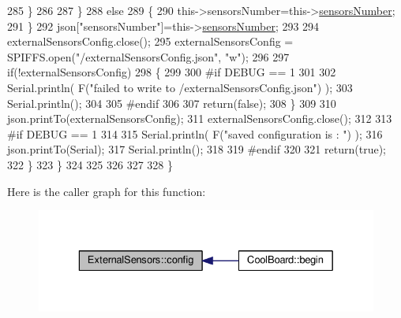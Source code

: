 \begin{DoxyCode}
285                 \}
286  
287             \}
288             \textcolor{keywordflow}{else}
289             \{
290                 this->sensorsNumber=this->\hyperlink{class_external_sensors_a58e4fbf9adeae787d92be5fa33043b5d}{sensorsNumber};
291             \}
292             json[\textcolor{stringliteral}{"sensorsNumber"}]=this->\hyperlink{class_external_sensors_a58e4fbf9adeae787d92be5fa33043b5d}{sensorsNumber};
293 
294             externalSensorsConfig.close();
295             externalSensorsConfig = SPIFFS.open(\textcolor{stringliteral}{"/externalSensorsConfig.json"}, \textcolor{stringliteral}{"w"});
296 
297             \textcolor{keywordflow}{if}(!externalSensorsConfig)
298             \{
299             
300 \textcolor{preprocessor}{            #if DEBUG == 1 }
301 
302                 Serial.println( F(\textcolor{stringliteral}{"failed to write to /externalSensorsConfig.json"}) );
303                 Serial.println();
304             
305 \textcolor{preprocessor}{            #endif}
306 
307                 \textcolor{keywordflow}{return}(\textcolor{keyword}{false});
308             \}
309             
310             json.printTo(externalSensorsConfig);
311             externalSensorsConfig.close();
312             
313 \textcolor{preprocessor}{        #if DEBUG == 1 }
314 
315             Serial.println( F(\textcolor{stringliteral}{"saved configuration is : "}) );
316             json.printTo(Serial);
317             Serial.println();
318         
319 \textcolor{preprocessor}{        #endif}
320 
321             \textcolor{keywordflow}{return}(\textcolor{keyword}{true}); 
322         \}
323     \}   
324     
325 
326 
327 
328 \}
\end{DoxyCode}
Here is the caller graph for this function\+:\nopagebreak
\begin{figure}[H]
\begin{center}
\leavevmode
\includegraphics[width=329pt]{d1/d2f/class_external_sensors_a862a4bd11346b37270d0244c2adabe5a_icgraph}
\end{center}
\end{figure}
\mbox{\label{class_external_sensors_ac829858f587e15a3fcb00567248f0edd}} 
